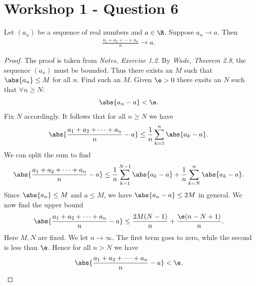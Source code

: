 \documentclass{article}
\begin{document}
\section{Workshop 1 - Question 6}

\begin{claim}
   Let $(a_n)$ be a sequence of real numbers and $a\in\R$. Suppose
   $a_n\to a$. Then
   \begin{align*}
      \frac{a_1 + a_2 + \cdots + a_n}{n}\to a.
   \end{align*}
   \begin{proof}
      The proof is taken from \emph{Notes, Exercise 1.2}.
      By \emph{Wade, Theorem 2.8}, the sequence $(a_n)$ must be bounded.
      Thus there exists an $M$ such that $\abs{a_n}\leq M$ for all $n$.
      Find such an $M$.
      Given $\e > 0$ there exsits an $N$ such that $\forall n \geq N$:
      \begin{align*}
         \abs{a_n - a} < \e.
      \end{align*}
      Fix $N$ accordingly. It follows that for all $n\geq N$ we have
      \begin{align*}
         \abs{\frac{a_1 + a_2 + \cdots + a_n}{n}-a} \leq
         \frac{1}{n}\sum_{k=1}^n \abs{a_k - a}.
      \end{align*}
      We can split the sum to find 
      \begin{align*}
         \abs{\frac{a_1 + a_2 + \cdots + a_n}{n}-a} \leq 
         \frac{1}{n}\sum_{k=1}^{N-1} \abs{a_k - a} + \frac{1}{n}\sum_{k=N}^n \abs{a_k-a}.
      \end{align*}
      Since $\abs{a_n}\leq M$ and $a\leq M$, we have $\abs{a_n-a}\leq 2M$ in general.
      We now find the upper bound
      \begin{align*}
         \abs{\frac{a_1 + a_2 + \cdots + a_n}{n}-a} \leq 
         \frac{2M(N-1)}{n} + \frac{\e(n-N+1)}{n}.
      \end{align*}
      Here $M,N$ are fixed. We let $n\to\infty$. The first term goes to zero, while
      the second is less than $\e$. Hence for all $n>N$ we have
      \begin{align*}
         \abs{\frac{a_1 + a_2 + \cdots + a_n}{n}-a} < \e.
      \end{align*} 
   \end{proof}
\end{claim}
\end{document}

